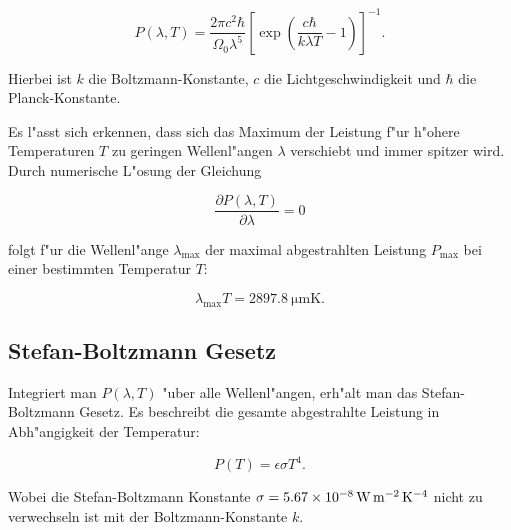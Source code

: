		\begin{equation*}
			P(\lambda, T) = \frac{2 \pi c^2 \hbar}{\Omega_0 \lambda^5} \left[ \exp \left(\frac{c \hbar}{k \lambda T} - 1\right) \right] ^{-1} .
		\end{equation*}

		Hierbei ist $k$ die Boltzmann-Konstante, $c$ die Lichtgeschwindigkeit und $\hbar$ die Planck-Konstante.

		Es l"asst sich erkennen, dass sich das Maximum der Leistung f"ur h"ohere Temperaturen $T$ zu geringen Wellenl"angen $\lambda$ verschiebt und immer spitzer wird.
		Durch numerische L"osung der Gleichung

		\begin{equation*}
			\frac{\partial P(\lambda, T)}{\partial \lambda} = 0
		\end{equation*}

		folgt f"ur die Wellenl"ange $\lambda_\mathrm{max}$ der maximal abgestrahlten Leistung $P_\mathrm{max}$ bei einer be\-stim\-mten Temperatur $T$:

		\begin{equation*}
			\lambda_\mathrm{max} T = \SI{2897.8}{\micro \meter \kelvin} .
		\end{equation*}


	\subsection{Stefan-Boltzmann Gesetz}

		Integriert man $P(\lambda, T)$ "uber alle Wellenl"angen, erh"alt man das Stefan-Boltzmann Gesetz.
		Es beschreibt die gesamte abgestrahlte Leistung in Abh"angigkeit der Temperatur:

		\begin{equation*}
			\label{boltzmann}
			P(T) = \epsilon \sigma T^4 .
		\end{equation*}

		Wobei die Stefan-Boltzmann Konstante $\sigma = \SI{5.67e-8}{\watt \per \meter \squared \per \raiseto{4} \kelvin}$ nicht zu verwechseln ist mit der Boltzmann-Konstante $k$.
